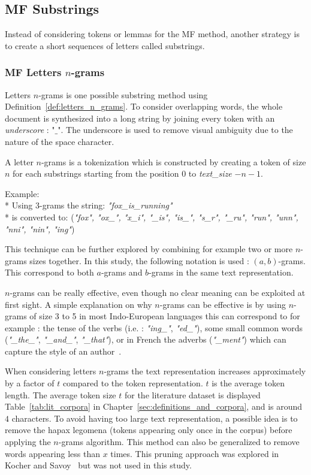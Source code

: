 \subsection{MF Substrings \label{sec:substrings}}

Instead of considering tokens or lemmas for the MF method, another strategy is to create a short sequences of letters called substrings.

\subsubsection{MF Letters $n$-grams}

Letters $n$-grams is one possible substring method using Definition~\ref{def:letters_n_grams}.
To consider overlapping words, the whole document is synthesized into a long string by joining every token with an \textit{underscore} : "$\_$".
The underscore is used to remove visual ambiguity due to the nature of the space character.

\begin{definition}
  A letter $n$-grams is a tokenization which is constructed by creating a token of size $n$ for each substrings starting from the position $0$ to \textit{text\_size} $- n - 1$.

  Example: \\*
  Using 3-grams the string: \textit{"fox\_is\_running"} \\*
  is converted to: (\textit{"fox", "ox\_", "x\_i", "\_is", "is\_", "s\_r", "\_ru", "run", "unn", "nni", "nin", "ing"})
\end{definition}

This technique can be further explored by combining for example two or more $n$-grams sizes together.
In this study, the following notation is used : $(a, b)$-grams.
This correspond to both $a$-grams and $b$-grams in the same text representation.

$n$-grams can be really effective, even though no clear meaning can be exploited at first sight.
A simple explanation on why $n$-grams can be effective is by using $n$-grams of size 3 to 5 in most Indo-European languages this can correspond to for example : the tense of the verbs (i.e. : \textit{"ing\_"}, \textit{"ed\_"}), some small common words (\textit{"\_the\_"}, \textit{"\_and\_"}, \textit{"\_that"}), or in French the adverbs (\textit{"\_ment"}) which can capture the style of an author~\cite{ngrams_authorship}.

When considering letters $n$-grams the text representation increases approximately by a factor of $t$ compared to the token representation.
$t$ is the average token length.
The average token size $t$ for the literature dataset is displayed Table~\ref{tab:lit_corpora} in Chapter~\ref{sec:definitions_and_corpora}, and is around $4$ characters.
To avoid having too large text representation, a possible idea is to remove the hapax legomena (tokens appearing only once in the corpus) before applying the $n$-grams algorithm.
This method can also be generalized to remove words appearing less than $x$ times.
This pruning approach was explored in Kocher and Savoy~\cite{kocher_linking} but was not used in this study.

